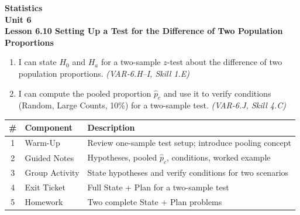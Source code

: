 \documentclass[10pt]{article}
\begin{document}
\vspace{-0.8in}

\begin{center}
  {\color{white}\textbf{\LARGE Statistics}}\\[4pt]
  {\color{skymid}\large\textbf{Unit 6}}\\[6pt]
  {\color{white}\textbf{\large Lesson 6.10 \quad Setting Up a Test for the Difference of Two Population Proportions}}
\end{center}

\vspace{0.22in}
\namedateperiod
\vspace{0.18in}

\begin{learningtargetbox}
\small
\begin{enumerate}[leftmargin=1.5em, itemsep=5pt]
  \item I can state $H_0$ and $H_a$ for a two-sample $z$-test about the difference of two population proportions. \textit{(VAR-6.H--I, Skill 1.E)}
  \item I can compute the pooled proportion $\hat p_c$ and use it to verify conditions (Random, Large Counts, 10\%) for a two-sample test. \textit{(VAR-6.J, Skill 4.C)}
\end{enumerate}
\end{learningtargetbox}

\vspace{0.14in}

\begin{tocbox}
\small
\renewcommand{\arraystretch}{1.5}
\begin{tabularx}{\linewidth}{@{} c l X @{}}
\rowcolor{sky}
\textbf{\#} & \textbf{Component} & \textbf{Description} \\
\midrule
1 & Warm-Up        & Review one-sample test setup; introduce pooling concept \\
2 & Guided Notes   & Hypotheses, pooled $\hat p_c$, conditions, worked example \\
3 & Group Activity & State hypotheses and verify conditions for two scenarios \\
4 & Exit Ticket    & Full State + Plan for a two-sample test \\
5 & Homework       & Two complete State + Plan problems \\
\end{tabularx}
\end{tocbox}
\end{document}
